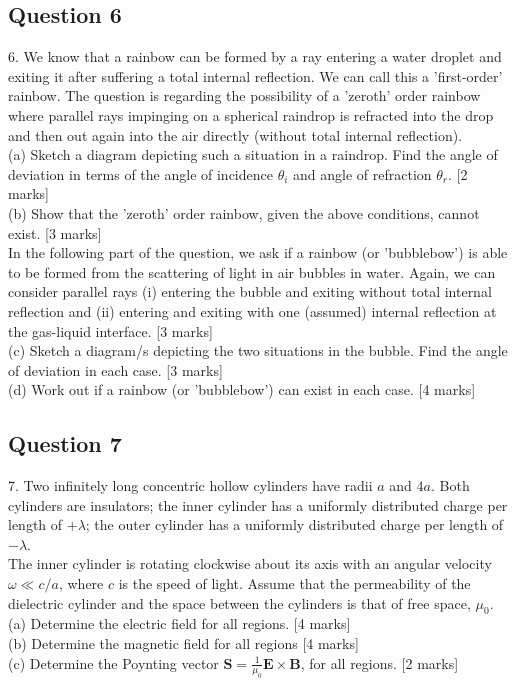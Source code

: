 \documentclass{article}
\begin{document}
\subsection{Question 6}
6. We know that a rainbow can be formed by a ray entering a water droplet and exiting it after suffering a total internal reflection. We can call this a 'first-order' rainbow. The question is regarding the possibility of a 'zeroth' order rainbow where parallel rays impinging on a spherical raindrop is refracted into the drop and then out again into the air directly (without total internal reflection). \\
(a) Sketch a diagram depicting such a situation in a raindrop. Find the angle of deviation in terms of the angle of incidence $\theta_{i}$ and angle of refraction $\theta_{r}$. [2 marks] \\
(b) Show that the 'zeroth' order rainbow, given the above conditions, cannot exist. [3 marks] \\
In the following part of the question, we ask if a rainbow (or 'bubblebow') is able to be formed from the scattering of light in air bubbles in water. Again, we can consider parallel rays (i) entering the bubble and exiting without total internal reflection and (ii) entering and exiting with one (assumed) internal reflection at the gas-liquid interface. [3 marks] \\
(c) Sketch a diagram/s depicting the two situations in the bubble. Find the angle of deviation in each case. [3 marks]\\
(d) Work out if a rainbow (or 'bubblebow') can exist in each case. [4 marks] 

\subsection{Question 7}
7. Two infinitely long concentric hollow cylinders have radii $a$ and $4 a$. Both cylinders are insulators; the inner cylinder has a uniformly distributed charge per length of $+\lambda$; the outer cylinder has a uniformly distributed charge per length of $-\lambda$. \\
The inner cylinder is rotating clockwise about its axis with an angular velocity $\omega \ll c / a$, where $c$ is the speed of light. Assume that the permeability of the dielectric cylinder and the space between the cylinders is that of free space, $\mu_{0}$. \\
(a) Determine the electric field for all regions. [4 marks] \\
(b) Determine the magnetic field for all regions [4 marks] \\
(c) Determine the Poynting vector $\mathbf{S}=\frac{1}{\mu_{0}} \mathbf{E} \times \mathbf{B}$, for all regions. [2 marks]
\end{document}
